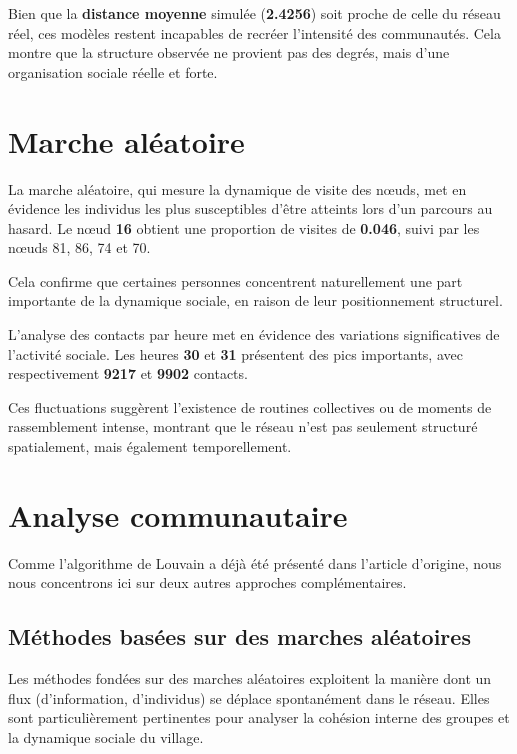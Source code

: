 \documentclass[10pt,twocolumn]{article}
\begin{document}
Bien que la \textbf{distance moyenne} simulée (\textbf{2.4256}) soit proche de celle du réseau réel, ces modèles restent incapables 
de recréer l’intensité des communautés. Cela montre que la structure observée ne provient pas des degrés, 
mais d’une organisation sociale réelle et forte.

\section{Marche aléatoire}

La marche aléatoire, qui mesure la dynamique de visite des nœuds, met en évidence les individus les plus susceptibles 
d’être atteints lors d’un parcours au hasard. Le nœud \textbf{16} obtient une proportion de visites de \textbf{0.046}, 
suivi par les nœuds 81, 86, 74 et 70.  

Cela confirme que certaines personnes concentrent naturellement une part importante de la dynamique sociale, 
en raison de leur positionnement structurel.



L’analyse des contacts par heure met en évidence des variations significatives de l’activité sociale. 
Les heures \textbf{30} et \textbf{31} présentent des pics importants, avec respectivement \textbf{9217} et \textbf{9902} contacts.  

Ces fluctuations suggèrent l’existence de routines collectives ou de moments de rassemblement intense, montrant que 
le réseau n’est pas seulement structuré spatialement, mais également temporellement.







\section{Analyse communautaire}
Comme l'algorithme de Louvain  a déjà été présenté dans l'article d'origine, nous nous concentrons ici sur deux autres approches complémentaires.   
\subsection{Méthodes basées sur des marches aléatoires}

Les méthodes fondées sur des marches aléatoires exploitent la manière dont un flux 
(d’information, d’individus) se déplace spontanément dans le réseau.
Elles sont particulièrement pertinentes pour analyser la cohésion interne des groupes
et la dynamique sociale du village.
\end{document}
